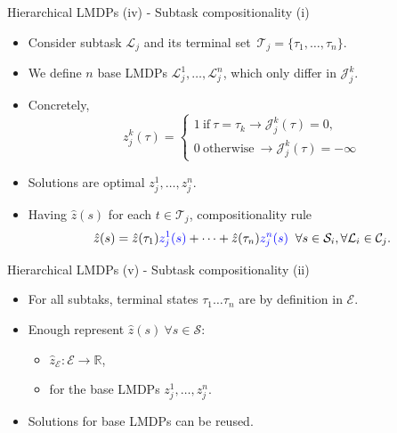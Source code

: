 \documentclass{beamer}
\theoremstyle{mystyle}
\newcommand{\cC}{\mathcal{C}}
\newcommand{\cE}{\mathcal{E}}
\newcommand{\cJ}{\mathcal{J}}
\newcommand{\cL}{\mathcal{L}}
\newcommand{\cS}{\mathcal{S}}
\newcommand{\cT}{\mathcal{T}}
\begin{document}
\begin{frame}{Hierarchical LMDPs (iv) - Subtask compositionality (i)}

\begin{itemize}
    \item Consider subtask $\cL_j$ and its terminal set~$\cT_j=\{\tau_1,\ldots,\tau_n\}$.
    \item We define {\color{blue} $n$ base LMDPs $\cL_j^1,\ldots,\cL_j^n$}, which only differ in $\cJ_j^k$.
    \item Concretely, 
    \[ 
        z_j^k(\tau)=\begin{cases}
            1 \ \text{if} \ \tau=\tau_k \rightarrow \cJ_j^k(\tau)=0,\\
            0 \ \text{otherwise} \ \rightarrow \cJ_j^k(\tau)=-\infty
        \end{cases}
    \]
    \item Solutions are {\color{blue} optimal $z_j^1,\ldots,z_j^n$.}
    \item Having $\hat z(s)$ for each $t \in \cT_j$, {\color{blue}compositionality rule}
    \begin{equation*}
        \hat{z}(s)=\hat{z}(\tau_1){\color{blue} z_j^1(s)}+\cdots+\hat{z}(\tau_n){\color{blue} z_j^n(s)} \;\; \forall s\in\cS_i,\forall\cL_i\in\cC_j.
    \end{equation*}
\end{itemize}

    
\end{frame}


\begin{frame}{Hierarchical LMDPs (v) - Subtask compositionality (ii)}


\begin{itemize}

    
   \item For all subtaks, terminal states $\tau_1 \dots \tau_n$ are by definition in $\cE$.
   \item Enough represent $\hat z(s) \ \forall s \in \cS$:
        \begin{itemize}
            \item $\hat{z}_\cE:\cE\rightarrow\mathbb{R}$, 
            \item for the base LMDPs {\color{blue} $z_j^1,\ldots,z_j^n$}.
        \end{itemize}
   \item Solutions for base LMDPs {\color{blue} can be reused}. 
    
\end{itemize}

\end{frame}
\end{document}
